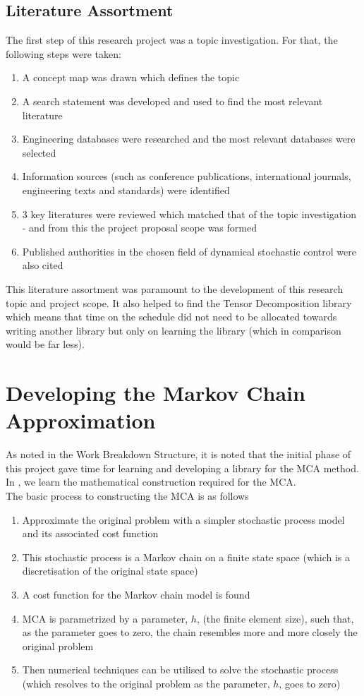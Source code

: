 \documentclass[11pt,draftd]{article}
\begin{document}
\subsection{Literature Assortment}
The first step of this research project was a topic investigation. For that, the following steps were taken:
\begin{enumerate}
	\item A concept map was drawn which defines the topic
	\item A search statement was developed and used to find the most relevant literature
	\item Engineering databases were researched and the most relevant databases were selected
	\item Information sources (such as conference publications, international journals, engineering texts and standards) were identified
	\item 3 key literatures were reviewed which matched that of the topic investigation - and from this the project proposal scope was formed
	\item Published authorities in the chosen field of dynamical stochastic control were also cited	
\end{enumerate}
This literature assortment was paramount to the development of this research topic and project scope. It also helped to find the Tensor Decomposition library which means that time on the schedule did not need to be allocated towards writing another library but only on learning the library (which in comparison would be far less). \\

\section{Developing the Markov Chain Approximation}
As noted in the Work Breakdown Structure, it is noted that the initial phase of this project gave time for learning and developing a library for the MCA method. In \cite{kushner}, we learn the mathematical construction required for the MCA.  \\

The basic process to constructing the MCA is as follows
\begin{enumerate}
	\item Approximate the original problem with a simpler stochastic process model and its associated cost function
	\item This stochastic process is a Markov chain on a finite state space (which is a discretisation of the original state space)
	\item A cost function for the Markov chain model is found
	\item MCA is parametrized by a parameter, $ h $, (the finite element size), such that, as the parameter goes to zero, the chain resembles more and more closely the original problem
	\item Then numerical techniques can be utilised to solve the stochastic process (which resolves to the original problem as the parameter, $ h $, goes to zero)
\end{enumerate}
\[\]
\end{document}
